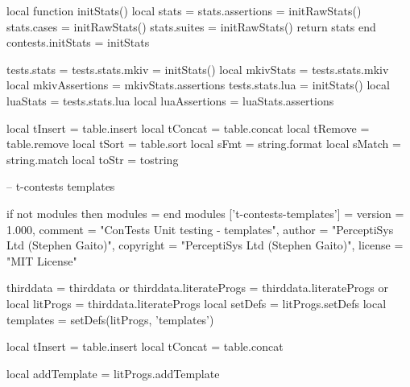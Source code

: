 local function initStats()
  local stats = {}
  stats.assertions = initRawStats()
  stats.cases      = initRawStats()
  stats.suites     = initRawStats()
  return stats
end
contests.initStats = initStats

tests.stats          = {}
tests.stats.mkiv     = initStats()
local mkivStats      = tests.stats.mkiv
local mkivAssertions = mkivStats.assertions
tests.stats.lua      = initStats()
local luaStats       = tests.stats.lua
local luaAssertions  = luaStats.assertions

local tInsert = table.insert
local tConcat = table.concat
local tRemove = table.remove
local tSort   = table.sort
local sFmt    = string.format
local sMatch  = string.match
local toStr   = tostring
\stopLuaCode

\startLuaTemplate
-- t-contests templates

if not modules then modules = { } end
modules ['t-contests-templates'] = {
    version   = 1.000,
    comment   = "ConTests Unit testing - templates",
    author    = "PerceptiSys Ltd (Stephen Gaito)",
    copyright = "PerceptiSys Ltd (Stephen Gaito)",
    license   = "MIT License"
}

thirddata               = thirddata               or {}
thirddata.literateProgs = thirddata.literateProgs or {}
local litProgs          = thirddata.literateProgs
local setDefs           = litProgs.setDefs
local templates         = setDefs(litProgs, 'templates')

local tInsert = table.insert
local tConcat = table.concat

local addTemplate = litProgs.addTemplate
\stopLuaTemplate

\stopchapter
